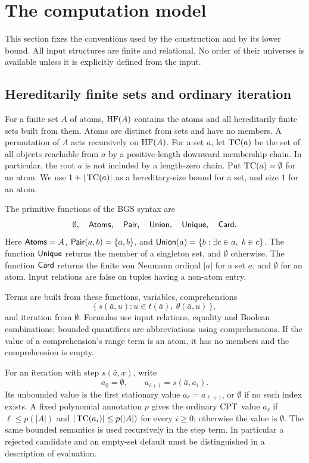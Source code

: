 \section{The computation model}\label{sec:formalism}

This section fixes the conventions used by the construction and by its
lower bound. All input structures are finite and relational. No order of
their universes is available unless it is explicitly defined from the input.

\subsection{Hereditarily finite sets and ordinary iteration}

For a finite set \(A\) of atoms, \(\operatorname{HF}(A)\) contains the atoms and all
hereditarily finite sets built from them. Atoms are distinct from sets and
have no members. A permutation of \(A\) acts recursively on \(\operatorname{HF}(A)\).
For a set \(a\), let \(\operatorname{TC}(a)\) be the set of all objects reachable from
\(a\) by a positive-length downward membership chain. In particular, the
root \(a\) is not included by a length-zero chain. Put \(\operatorname{TC}(a)=\emptyset\)
for an atom. We use \(1+|\operatorname{TC}(a)|\) as a hereditary-size bound for a set,
and size \(1\) for an atom.

The primitive functions of the BGS syntax are
\[
 \emptyset,\quad \mathsf{Atoms},\quad \mathsf{Pair},\quad \mathsf{Union},\quad \mathsf{Unique},\quad \mathsf{Card} .
\]
Here \(\mathsf{Atoms}=A\), \(\mathsf{Pair}(a,b)=\{a,b\}\), and
\(\mathsf{Union}(a)=\{b:\exists c\in a,\ b\in c\}\).
The function \(\mathsf{Unique}\) returns the member of a singleton set, and
\(\emptyset\) otherwise. The function \(\mathsf{Card}\) returns the finite von
Neumann ordinal \(|a|\) for a set \(a\), and \(\emptyset\) for an atom.
Input relations are false on tuples having a non-atom entry.

Terms are built from these functions, variables, comprehensions
\[
 \{\,s(\bar a,u):u\in t(\bar a),\ \theta(\bar a,u)\,\},
\]
and iteration from \(\emptyset\). Formulas use input relations, equality
and Boolean combinations; bounded quantifiers are abbreviations using
comprehensions. If the value of a comprehension's range term is an atom,
it has no members and the comprehension is empty.

For an iteration with step \(s(\bar a,x)\), write
\[
 a_0=\emptyset,\qquad a_{i+1}=s(\bar a,a_i).
\]
Its unbounded value is the first stationary value \(a_\ell=a_{\ell+1}\),
or \(\emptyset\) if no such index exists. A fixed polynomial annotation
\(p\) gives the ordinary \(\mathrm{CPT}\) value \(a_\ell\) if
\(\ell\le p(|A|)\) and \(|\operatorname{TC}(a_i)|\le p(|A|)\) for every \(i\ge0\);
otherwise the value is \(\emptyset\). The same bounded semantics is used
recursively in the step term. In particular a rejected candidate and an
empty-set default must be distinguished in a description of evaluation.

